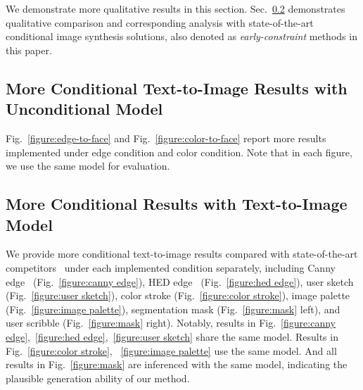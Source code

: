 \documentclass{article}
\begin{document}
We demonstrate more qualitative results in this section. Sec.~\ref{subsection:more results} demonstrates qualitative comparison and corresponding analysis with state-of-the-art conditional image synthesis solutions, also denoted as \textit{early-constraint} methods in this paper.

\subsection{More Conditional Text-to-Image Results with Unconditional Model}
Fig.~\ref{figure:edge-to-face} and Fig.~\ref{figure:color-to-face} report more results implemented under edge condition and color condition. Note that in each figure, we use the same model for evaluation.

\subsection{More Conditional Results with Text-to-Image Model}
\label{subsection:more results}
We provide more conditional text-to-image results compared with state-of-the-art competitors~\cite{rombach2022high,zhang2023adding,mou2023t2i,meng2021sdedit} under each implemented condition separately, including Canny edge~\cite{canny1986computational} (Fig.~\ref{figure:canny edge}), HED edge~\cite{xie2015holistically} (Fig.~\ref{figure:hed edge}), user sketch (Fig.~\ref{figure:user sketch}), color stroke (Fig.~\ref{figure:color stroke}), image palette (Fig.~\ref{figure:image palette}), segmentation mask (Fig.~\ref{figure:mask} left), and user scribble (Fig.~\ref{figure:mask} right). Notably, results in Fig.~\ref{figure:canny edge},~\ref{figure:hed edge},~\ref{figure:user sketch} share the same model. Results in Fig.~\ref{figure:color stroke}, ~\ref{figure:image palette} use the same model. And all results in Fig.~\ref{figure:mask} are inferenced with the same model, indicating the plausible generation ability of our method.
\end{document}
